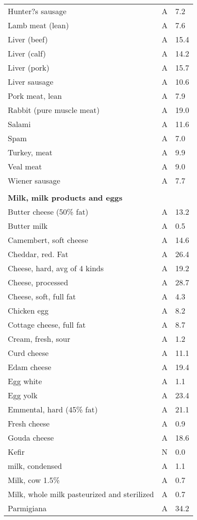 \documentclass[../main.tex]{subfiles}
\begin{document}
\begin{longtable}{p{7cm}p{0.5cm}p{1cm}}
Hunter?s sausage  & A  & 7.2 \\
Lamb meat (lean)  & A  & 7.6 \\
Liver (beef)  & A  & 15.4 \\
Liver (calf)  & A  & 14.2 \\
Liver (pork)  & A  & 15.7 \\
Liver sausage  & A  & 10.6 \\
Pork meat, lean  & A  & 7.9 \\
Rabbit (pure muscle meat)  & A  & 19.0 \\
Salami  & A  & 11.6 \\
Spam  & A  & 7.0 \\
Turkey, meat  & A  & 9.9 \\
Veal meat  & A  & 9.0 \\
Wiener sausage  & A  & 7.7 \\
 \\
\multicolumn{3}{l}{\textbf{Milk, milk products and eggs}}  \\
Butter cheese (50\% fat)  & A  & 13.2 \\
Butter milk  & A  & 0.5 \\
Camembert, soft cheese  & A  & 14.6 \\
Cheddar, red. Fat  & A  & 26.4 \\
Cheese, hard, avg of 4 kinds  & A  & 19.2 \\
Cheese, processed  & A  & 28.7 \\
Cheese, soft, full fat  & A  & 4.3 \\
Chicken egg  & A  & 8.2 \\
Cottage cheese, full fat  & A  & 8.7 \\
Cream, fresh, sour  & A  & 1.2 \\
Curd cheese  & A  & 11.1 \\
Edam cheese  & A  & 19.4 \\
Egg white   & A  & 1.1 \\
Egg yolk  & A  & 23.4 \\
Emmental, hard (45\% fat)  & A  & 21.1 \\
Fresh cheese  & A  & 0.9 \\
Gouda cheese  & A  & 18.6 \\
Kefir  & N  & 0.0 \\
milk, condensed  & A  & 1.1 \\
Milk, cow 1.5\%  & A  & 0.7 \\
Milk, whole milk pasteurized and sterilized  & A  & 0.7 \\
Parmigiana  & A  & 34.2 \\

\end{longtable}
\end{document}
